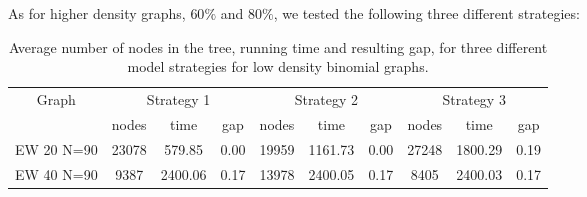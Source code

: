 As for higher density graphs, $60\%$ and $80\%$, we tested the following three different strategies:

\begin{itemize}
\end{itemize}

\begin{table}[h]
\centering
\begin{tabular}{|c|ccc|ccc|ccc|}
\hline
\multicolumn{1}{|c|}{Graph} & \multicolumn{3}{|c|}{Strategy 1} & \multicolumn{3}{|c|}{Strategy 2} & \multicolumn{3}{|c|}{Strategy 3}
\\
 & nodes & time & gap & nodes & time & gap & nodes & time & gap
\\
\hline
EW 20 N=90 & 23078 & 579.85 & 0.00 & 19959 & 1161.73 & 0.00 & 27248 & 1800.29 & 0.19
\\
EW 40 N=90 & 9387 & 2400.06 & 0.17 & 13978 & 2400.05 & 0.17 & 8405 & 2400.03 & 0.17
\\
\hline 
 \end{tabular}

\caption{Average number of nodes in the tree, running time and resulting gap, for three different model strategies for low density binomial graphs.}
\label{table:bnc:modellow}

\end{table}

